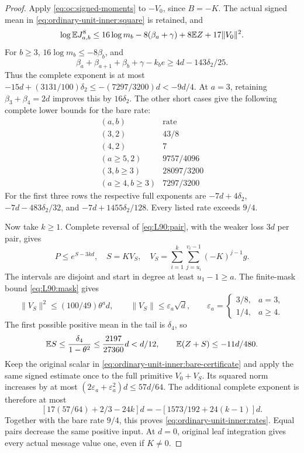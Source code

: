 \begin{proof}
Apply \eqref{eq:oc:signed-moments} to \(-V_0\), since \(B=-K\).
The actual signed mean in \eqref{eq:ordinary-unit-inner:square}
is retained, and
\begin{equation}\label{eq:ordinary-unit-inner:bare-certificate}
 \log\mathbb E J_{a,b}^8\le16\log m_b-8(\beta_a+\gamma)
                         +8\mathbb E Z+17\|V_0\|^2.
\end{equation}
For \(b\ge3\), \(16\log m_b\le-8\beta_b\), and
\[
 \beta_a+\beta_{a+1}+\beta_b+\gamma-k_be
       \ge4d-143\delta_2/25.
\]
Thus the complete exponent is at most
\(-15d+(3131/100)\delta_2\le-(7297/3200)d<-9d/4\).
At \(a=3\), retaining \(\beta_3+\beta_4=2d\) improves this
by \(16\delta_2\). The other short cases give the following
complete lower bounds for the bare rate:
\begin{equation}\label{eq:ordinary-unit-inner:bare-rates}
\begin{array}{c|c}
 (a,b)&\text{rate}\\
 \hline
 (3,2)&43/8\\
 (4,2)&7\\
 (a\ge5,2)&9757/4096\\
 (3,b\ge3)&28097/3200\\
 (a\ge4,b\ge3)&7297/3200
\end{array}
\end{equation}
For the first three rows the respective full exponents are
\(-7d+4\delta_2\), \(-7d-483\delta_2/32\), and
\(-7d+1455\delta_2/128\). Every listed rate exceeds \(9/4\).

Now take \(k\ge1\). Complete reversal of \eqref{eq:L90:pair},
with the weaker loss \(3d\) per pair, gives
\begin{equation}\label{eq:ordinary-unit-inner:post-mask}
 P\le e^{S-3kd},\quad S=KV_S,\quad
 V_S=\sum_{i=1}^k\sum_{j=u_i}^{v_i-1}(-K)^{j-1}g.
\end{equation}
The intervals are disjoint and start in degree at least
\(u_1-1\ge a\). The finite-mask bound \eqref{eq:L90:mask} gives
\[
 \|V_S\|^2\le(100/49)\theta^a d,\qquad
 \|V_S\|\le\varepsilon_a\sqrt d,\qquad
 \varepsilon_a=\begin{cases}3/8,&a=3,\\1/4,&a\ge4.\end{cases}
\]
The first possible positive mean in the tail is \(\delta_4\), so
\[
 \mathbb E S\le\frac{\delta_4}{1-\theta^2}
       \le\frac{2197}{27360}d<d/12,
 \qquad \mathbb E(Z+S)\le-11d/480.
\]
Keep the original scalar in \eqref{eq:ordinary-unit-inner:bare-certificate}
and apply the same signed estimate once to the full primitive
\(V_0+V_S\). Its squared norm increases by at most
\((2\varepsilon_a+\varepsilon_a^2)d\le57d/64\).
The additional complete exponent is therefore at most
\[
 [17(57/64)+2/3-24k]d
       =-[1573/192+24(k-1)]d.
\]
Together with the bare rate \(9/4\), this proves
\eqref{eq:ordinary-unit-inner:rates}. Equal pairs decrease the
same positive input. At \(d=0\), original leaf integration
gives every actual message value one, even if \(K\ne0\).
\end{proof}

